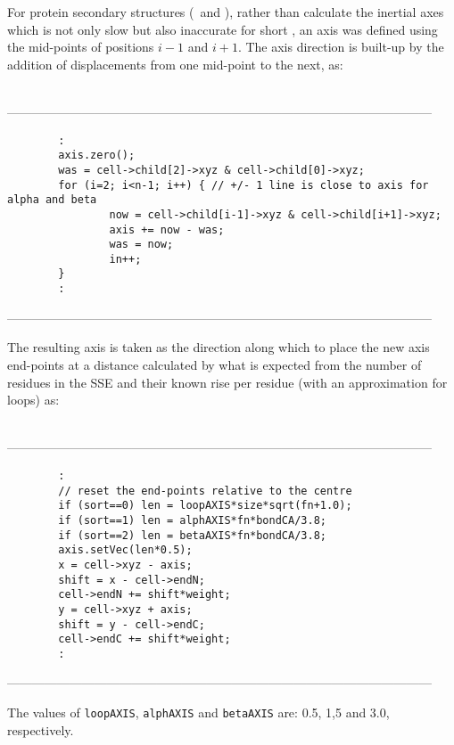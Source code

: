 For protein secondary structures (\A\ and \B), rather than calculate the inertial axes
which is not only slow but also inaccurate for short \AHs, an axis was defined using the
mid-points of positions $i-1$ and $i+1$.  The axis direction is built-up by the addition
of displacements from one mid-point to the next, as:
\begin{singlespace}
\ \\
------------------------------------------------------------------------------------------------------
\begin{tiny}
\begin{verbatim}
        :
        axis.zero();
        was = cell->child[2]->xyz & cell->child[0]->xyz;
        for (i=2; i<n-1; i++) { // +/- 1 line is close to axis for alpha and beta
                now = cell->child[i-1]->xyz & cell->child[i+1]->xyz;
                axis += now - was;
                was = now;
                in++;
        }
        :
\end{verbatim}
\end{tiny}
------------------------------------------------------------------------------------------------------
\end{singlespace}
The resulting axis is taken as the direction along which to place the new axis end-points
at a distance calculated by what is expected from the number of residues in the SSE and
their known rise per residue (with an approximation for loops) as:
\begin{singlespace}
\ \\
------------------------------------------------------------------------------------------------------
\begin{tiny}
\begin{verbatim}
        :
        // reset the end-points relative to the centre
        if (sort==0) len = loopAXIS*size*sqrt(fn+1.0);
        if (sort==1) len = alphAXIS*fn*bondCA/3.8;
        if (sort==2) len = betaAXIS*fn*bondCA/3.8;
        axis.setVec(len*0.5);
        x = cell->xyz - axis;
        shift = x - cell->endN;
        cell->endN += shift*weight;
        y = cell->xyz + axis;
        shift = y - cell->endC;
        cell->endC += shift*weight;
        :
\end{verbatim}
\end{tiny}
------------------------------------------------------------------------------------------------------
\end{singlespace}
The values of {\tt loopAXIS}, {\tt alphAXIS} and {\tt betaAXIS} are: 0.5, 1,5 and 3.0, respectively.

